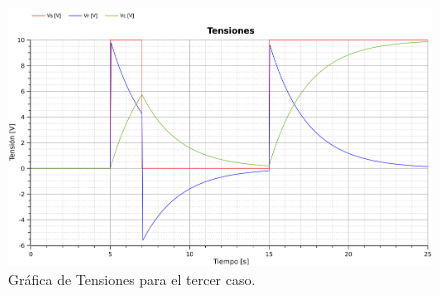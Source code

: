 \begin{figure}[H]
  \centering
  \label{gr:caso1:tensiones}
  \includegraphics[width=\textwidth]{modelica/graficas/3-tensiones}
  \caption{Gráfica de Tensiones para el tercer caso.}
\end{figure}
